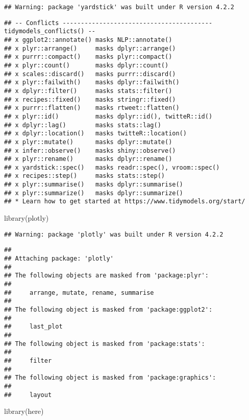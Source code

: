 \documentclass[
]{article}
\newenvironment{Shaded}{\begin{snugshade}}{\end{snugshade}}
\newcommand{\FunctionTok}[1]{\textcolor[rgb]{0.00,0.00,0.00}{#1}}
\newcommand{\NormalTok}[1]{#1}
\begin{document}
\begin{verbatim}
## Warning: package 'yardstick' was built under R version 4.2.2
\end{verbatim}

\begin{verbatim}
## -- Conflicts ----------------------------------------- tidymodels_conflicts() --
## x ggplot2::annotate() masks NLP::annotate()
## x plyr::arrange()     masks dplyr::arrange()
## x purrr::compact()    masks plyr::compact()
## x plyr::count()       masks dplyr::count()
## x scales::discard()   masks purrr::discard()
## x plyr::failwith()    masks dplyr::failwith()
## x dplyr::filter()     masks stats::filter()
## x recipes::fixed()    masks stringr::fixed()
## x purrr::flatten()    masks rtweet::flatten()
## x plyr::id()          masks dplyr::id(), twitteR::id()
## x dplyr::lag()        masks stats::lag()
## x dplyr::location()   masks twitteR::location()
## x plyr::mutate()      masks dplyr::mutate()
## x infer::observe()    masks shiny::observe()
## x plyr::rename()      masks dplyr::rename()
## x yardstick::spec()   masks readr::spec(), vroom::spec()
## x recipes::step()     masks stats::step()
## x plyr::summarise()   masks dplyr::summarise()
## x plyr::summarize()   masks dplyr::summarize()
## * Learn how to get started at https://www.tidymodels.org/start/
\end{verbatim}

\begin{Shaded}
\begin{Highlighting}[]
\FunctionTok{library}\NormalTok{(plotly)}
\end{Highlighting}
\end{Shaded}

\begin{verbatim}
## Warning: package 'plotly' was built under R version 4.2.2
\end{verbatim}

\begin{verbatim}
## 
## Attaching package: 'plotly'
## 
## The following objects are masked from 'package:plyr':
## 
##     arrange, mutate, rename, summarise
## 
## The following object is masked from 'package:ggplot2':
## 
##     last_plot
## 
## The following object is masked from 'package:stats':
## 
##     filter
## 
## The following object is masked from 'package:graphics':
## 
##     layout
\end{verbatim}

\begin{Shaded}
\begin{Highlighting}[]
\FunctionTok{library}\NormalTok{(here)}
\end{Highlighting}
\end{Shaded}
\end{document}

